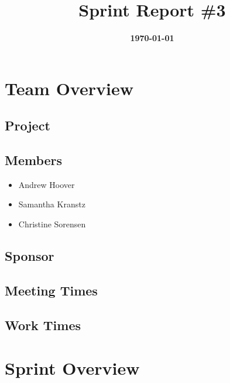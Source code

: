 \documentclass{article}
\title{\normalfont\Large\bfseries\color{TitleColor}Sprint Report \#3}
\date{\normalfont\bfseries\color{TitleColor}\today}
\begin{document}
\maketitle

\section*{Team Overview}
\subsection*{Project}

\subsection*{Members}
\begin{itemize}
	\item Andrew Hoover
	\item Samantha Kranstz
	\item Christine Sorensen
\end{itemize}

\subsection*{Sponsor}

\subsection*{Meeting Times}
\subsection*{Work Times}

\section*{Sprint Overview}
\end{document}
